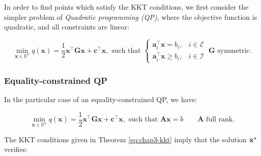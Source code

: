 In order to find points which satisfy the KKT conditions, we first
consider the simpler problem of \emph{Quadratic programming (QP)},
where the objective function is quadratic, and all constraints are
linear:

\begin{equation}
\label{eq:chap3-qp}
\min_{\mathbf{x} \in \mathbb R^n}
q(\mathbf{x})=\frac{1}{2}\mathbf{x}^{\top}\mathbf{G}\mathbf{x}
+\mathbf{c}^{\top}\mathbf{x},\text{ such that }
\left\{\begin{array}{cc}
\mathbf{a}_i^{\top}\mathbf{x} = b_i, & i \in \mathcal{E} \\%
\mathbf{a}_i^{\top}\mathbf{x} \ge b_i, & i \in \mathcal{I} %
\end{array}\right. ~\mathbf{G}\text{ symmetric.}
\end{equation}

\subsubsection{Equality-constrained QP}

In the particular case of an equality-constrained QP, we have:

\begin{equation}
\label{eq:chap3-qp-eq}
\min_{\mathbf{x} \in \mathbb R^n}
q(\mathbf{x})=\frac{1}{2}\mathbf{x}^{\top}\mathbf{G}\mathbf{x}
+\mathbf{c}^{\top}\mathbf{x},\text{ such that }
\mathbf{A}\mathbf{x} = b
\qquad \mathbf{A} \text{ full rank.}
\end{equation}

The KKT conditions given in Theorem \ref{eq:chap3-kkt} imply that the
solution $\mathbf{x}^{\star}$ verifies:

